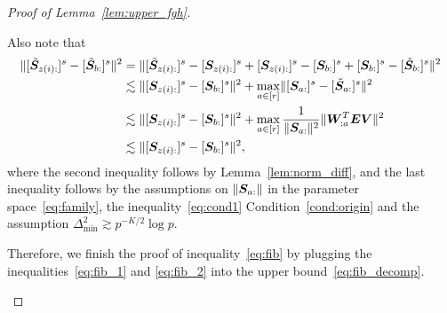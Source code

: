 \documentclass[lettersize,onecolumn,journal]{IEEEtran}
\theoremstyle{definition}
\theoremstyle{definition}
\begin{document}
\begin{proof}[Proof of Lemma~\ref{lem:upper_fgh}]
\begin{enumerate}
    Also note that 
    \begin{align}
        \onormSize{}{  [  \tilde \mS_{z(i):} ]^s - [  \tilde \mS_{b:} ]^s  }^2 &=  \onormSize{}{  [  \tilde \mS_{z(i):} ]^s -[ \mS_{z(i):} ]^s +  [ \mS_{z(i):} ]^s - [ \mS_{b:} ]^s + [ \mS_{b:} ]^s -[  \tilde \mS_{b:} ]^s  }^2 \\
        & \lesssim \onormSize{}{ [ \mS_{z(i):} ]^s - [ \mS_{b:} ]^s }^2 + \max_{a \in [r]} \onormSize{}{ [ \mS_{a:} ]^s -[  \tilde \mS_{a:} ]^s }^2 \\
        & \lesssim \onormSize{}{ [ \mS_{z(i):} ]^s - [ \mS_{b:} ]^s }^2  + \max_{a \in [r]} \frac{1}{\onormSize{}{\mS_{a:} }^2} \onormSize{}{ \mW_{:a}^T \mE \mV}^2\\
        & \lesssim \onormSize{}{ [ \mS_{z(i):} ]^s - [ \mS_{b:} ]^s }^2, \label{eq:fib_2}
    \end{align}
    where the second inequality follows by Lemma~\ref{lem:norm_diff}, and the last inequality follows by the assumptions on $\lVert\bm S_{a:}\rVert$ in the parameter space~\eqref{eq:family}, the inequality~\eqref{eq:cond1} Condition~\ref{cond:origin} and the assumption $\Delta_{\min}^2 \gtrsim p^{-K/2}\log p$. 
    
    Therefore, we finish the proof of inequality~\eqref{eq:fib} by plugging the inequalities~\eqref{eq:fib_1} and \eqref{eq:fib_2} into the upper bound~\eqref{eq:fib_decomp}.
    

\end{enumerate}
\end{proof}
\end{document}
